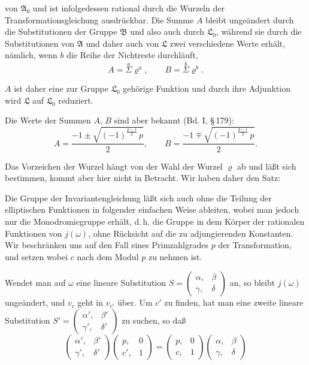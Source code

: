 von $\mathfrak{A}_0$ und ist infolgedessen rational durch die Wurzeln der
Transformationsgleichung ausdrückbar. Die Summe $A$ bleibt
ungeändert durch die Substitutionen der Gruppe $\mathfrak{B}$ und also
auch durch $\mathfrak{L}_0$, während sie durch die Substitutionen von $\mathfrak{A}$ und
daher auch von $\mathfrak{L}$ zwei verschiedene Werte erhält, nämlich,
wenn $b$ die Reihe der Nichtreste durchläuft,
\[
A = \overset{a}{\Sigma}\varrho^a, \qquad B = \overset{b}{\Sigma}\varrho^b.
\]

$A$ ist daher eine zur Gruppe $\mathfrak{L}_0$ gehörige Funktion und
durch ihre Adjunktion wird $\mathfrak{L}$ auf $\mathfrak{L}_0$ reduziert.

Die Werte der Summen $A$, $B$ sind aber bekannt (Bd. I, \S\,179):
\[
A = \frac{-1 \pm \sqrt{(-1)^{\frac{p-1}{2}}\,p}}{2}, \qquad
B = \frac{-1 \mp \sqrt{(-1)^{\frac{p-1}{2}}\,p}}{2}.
\]

Das Vorzeichen der Wurzel hängt von der Wahl der Wurzel $\varrho$
ab und läßt sich bestimmen, kommt aber hier nicht in Betracht.
Wir haben daher den Satz:


Die Gruppe der Invariantengleichung läßt sich auch ohne
die Teilung der elliptischen Funktionen in folgender einfachen
Weise ableiten, wobei man jedoch nur die Monodromiegruppe
 erhält, d.\,h. die Gruppe in dem Körper der rationalen
Funktionen von $j(\omega)$, ohne Rücksicht auf die zu adjungierenden
Konstanten. Wir beschränken uns auf den Fall eines Primzahlgrades
 $p$ der Transformation, und setzen
wobei $c$ nach dem Modul $p$ zu nehmen ist.

Wendet man auf $\omega$ eine lineare Substitution $S = \begin{pmatrix}\alpha, & \beta \\ \gamma, & \delta\end{pmatrix}$
an, so bleibt $j(\omega)$ ungeändert, und $v_c$ geht in $v_{c'}$ über. Um
$c'$ zu finden, hat man eine zweite lineare Substitution
$S' = \begin{pmatrix}\alpha', & \beta' \\ \gamma', & \delta'\end{pmatrix}$ zu suchen, so daß
\[
\begin{pmatrix}\alpha', & \beta' \\ \gamma', & \delta'\end{pmatrix}
\begin{pmatrix}p, & 0 \\ c', & 1\end{pmatrix}
=
\begin{pmatrix}p, & 0 \\ c, & 1\end{pmatrix}
\begin{pmatrix}\alpha, & \beta \\ \gamma, & \delta\end{pmatrix}
\]
